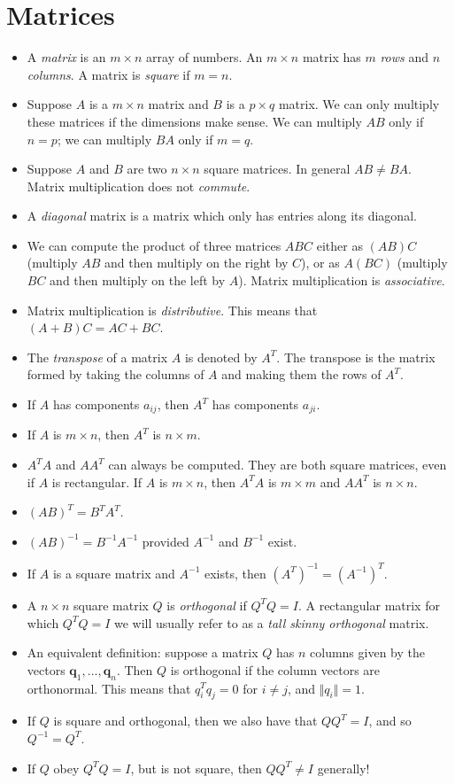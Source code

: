 \documentclass[11pt]{article}
\renewcommand*{\vec}[1]{\mathbf{#1}}
\begin{document}
\newpage

\section{Matrices}
\begin{itemize}
\item A \emph{matrix} is an $m \times n$ array of numbers. An $m\times n$ matrix has $m$ \emph{rows} and $n$ \emph{columns}. A matrix is \emph{square} if $m=n$.  
\item Suppose $A$ is a $m\times n$ matrix and $B$ is a $p\times q$ matrix. We can only multiply these matrices if the dimensions make sense. We can multiply $AB$ only if $n=p$; we can multiply $BA$ only if $m=q$.
\item Suppose $A$ and $B$ are two $n\times n$ square matrices. In general $\boxed{AB \neq BA}$. Matrix multiplication does not \emph{commute}. 
\item A \emph{diagonal} matrix is a matrix which only has entries along its diagonal.
\item We can compute the product of three matrices $ABC$ either as $(AB)C$ (multiply $AB$ and then multiply on the right by $C$), or as $A(BC)$ (multiply $BC$ and then multiply on the left by $A$). Matrix multiplication is \emph{associative}. 
\item Matrix multiplication is \emph{distributive}. This means that $(A+B)C = AC + BC$. 
\item The \emph{transpose} of a matrix $A$ is denoted by $A^T$. The transpose is the matrix formed by taking the columns of $A$ and making them the rows of $A^T$. 
\item If $A$ has components $a_{ij}$, then $A^T$ has components $a_{ji}$.
\item If $A$ is $m\times n$, then $A^T$ is $n\times m$.
\item $A^TA$ and $AA^T$ can always be computed. They are both square matrices, even if $A$ is rectangular. If $A$ is $m\times n$, then $A^TA$ is $m\times m$ and $AA^T$ is $n\times n$.
\item $\boxed{(AB)^T = B^TA^T}$.
\item $\boxed{(AB)^{-1} = B^{-1}A^{-1}}$ provided $A^{-1}$ and $B^{-1}$ exist.
\item If $A$ is a square matrix and $A^{-1}$ exists, then $\boxed{(A^T)^{-1} = (A^{-1})^T}$. 
\item A $n\times n$ square matrix $Q$ is \emph{orthogonal} if $\boxed{Q^TQ=I}$. A rectangular matrix for which $Q^TQ=I$ we will usually refer to as a \emph{tall skinny orthogonal} matrix. 
\item An equivalent definition: suppose a matrix $Q$ has $n$ columns given by the vectors $\vec{q}_1, ..., \vec{q}_n$. Then $Q$ is orthogonal if the column vectors are orthonormal. This means that $q_i^Tq_j = 0$ for $i\neq j$, and $\Vert q_i \Vert = 1$. 
\item If $Q$ is square and orthogonal, then we also have that $QQ^T = I$, and so $Q^{-1}=Q^T$.
\item If $Q$ obey $Q^TQ=I$, but is not square, then $QQ^T \neq I$ generally! 
\end{itemize}
\end{document}
